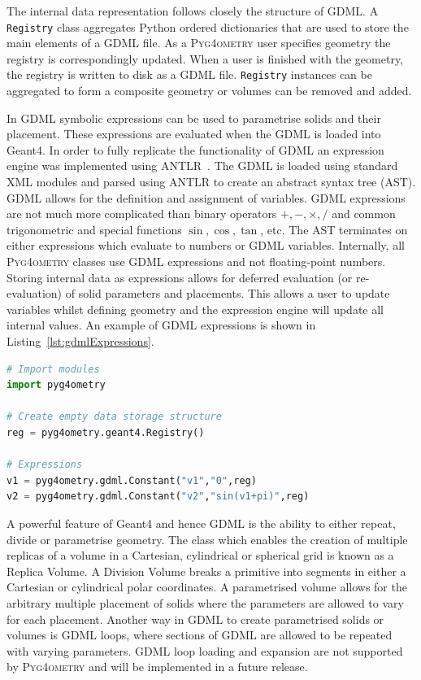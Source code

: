 \documentclass[final,5p,times,twocolumn]{elsarticle}
\newcommand{\PYGEOMETRY}{\textsc{Pyg4ometry}}
\begin{document}
The internal data representation follows closely the structure of GDML. A \verb|Registry| class aggregates Python ordered dictionaries that are  used to store the main 
elements of a GDML file. As a \PYGEOMETRY{} user specifies geometry the registry is correspondingly updated. When a user is finished with the geometry, the registry is written to disk as a GDML file.
\verb|Registry| instances can be aggregated to form a composite geometry or volumes can be removed and added. 

In GDML symbolic expressions can be used to parametrise solids and their placement. These expressions are evaluated when the GDML is loaded into Geant4. 
In order to fully replicate the functionality of GDML an expression engine was implemented using ANTLR~\cite{10.5555/2501720}. The GDML is loaded using 
standard XML modules and parsed using ANTLR to create an abstract syntax tree (AST).  GDML allows for the definition 
and assignment of variables. GDML expressions are not much more complicated than binary operators $+, -, \times, /$ and common trigonometric and special functions $\sin, \cos, \tan$, etc. The AST terminates on either expressions which evaluate to numbers or GDML variables. Internally, all \PYGEOMETRY{} 
classes use GDML expressions and not floating-point numbers. Storing internal data as expressions allows for deferred evaluation (or re-evaluation) of 
solid parameters and  placements. This allows a user to update variables whilst defining geometry and the expression engine will update all internal values. 
An example of GDML expressions is shown in Listing~\ref{lst:gdmlExpressions}.

\begin{lstlisting}[caption={A simple Python script using \PYGEOMETRY{} to create GDML variables.},label={lst:gdmlExpressions}, language=Python]
# Import modules 
import pyg4ometry

# Create empty data storage structure
reg = pyg4ometry.geant4.Registry()

# Expressions 
v1 = pyg4ometry.gdml.Constant("v1","0",reg)
v2 = pyg4ometry.gdml.Constant("v2","sin(v1+pi)",reg)

\end{lstlisting}

 
A powerful feature of Geant4 and hence GDML is the ability to either repeat, divide or parametrise geometry. The class which enables the creation of 
multiple replicas of a volume in a Cartesian, cylindrical or spherical grid is known as a Replica Volume. A Division Volume breaks a primitive into segments 
in either a Cartesian or cylindrical polar coordinates. A parametrised volume allows for the arbitrary multiple placement of solids where the parameters are 
allowed to vary for each placement.  Another way in GDML to create parametrised solids or volumes is GDML loops, where sections of GDML are allowed 
to be repeated with varying parameters. GDML loop loading and expansion are not supported by \PYGEOMETRY{} and will be implemented in a 
future release.
  
\end{document}
